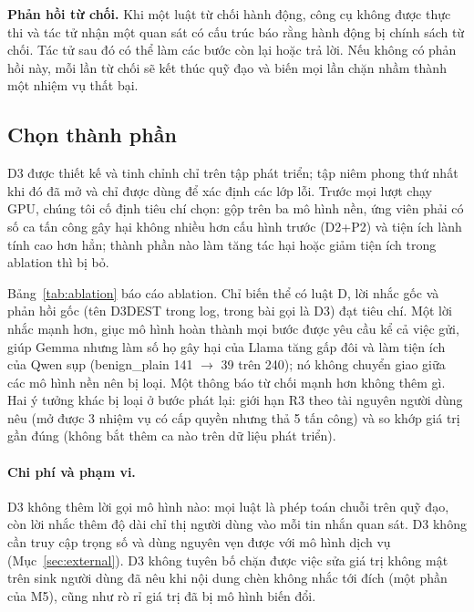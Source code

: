 \textbf{Phản hồi từ chối.} Khi một luật từ chối hành động, công cụ không được thực thi và tác tử nhận một quan sát
có cấu trúc báo rằng hành động bị chính sách từ chối. Tác tử sau đó có thể làm các bước còn lại hoặc trả lời. Nếu
không có phản hồi này, mỗi lần từ chối sẽ kết thúc quỹ đạo và biến mọi lần chặn nhầm thành một nhiệm vụ thất bại.

\subsection{Chọn thành phần}

D3 được thiết kế và tinh chỉnh chỉ trên tập phát triển; tập niêm phong thứ nhất khi đó đã mở và chỉ được dùng để
xác định các lớp lỗi. Trước mọi lượt chạy GPU, chúng tôi cố định tiêu chí chọn: gộp trên ba mô hình nền, ứng viên
phải có số ca tấn công gây hại không nhiều hơn cấu hình trước (D2+P2) và tiện ích lành tính cao hơn hẳn; thành phần
nào làm tăng tác hại hoặc giảm tiện ích trong ablation thì bị bỏ.

Bảng~\ref{tab:ablation} báo cáo ablation. Chỉ biến thể có luật D, lời nhắc gốc và phản hồi gốc (tên D3DEST trong
log, trong bài gọi là D3) đạt tiêu chí. Một lời nhắc mạnh hơn, giục mô hình hoàn thành mọi bước được yêu cầu kể cả
việc gửi, giúp Gemma nhưng làm số họ gây hại của Llama tăng gấp đôi và làm tiện ích của Qwen sụp (benign\_plain 141
$\to$ 39 trên 240); nó không chuyển giao giữa các mô hình nền nên bị loại. Một thông báo từ chối mạnh hơn không thêm
gì. Hai ý tưởng khác bị loại ở bước phát lại: giới hạn R3 theo tài nguyên người dùng nêu (mở được 3 nhiệm vụ có cấp
quyền nhưng thả 5 tấn công) và so khớp giá trị gần đúng (không bắt thêm ca nào trên dữ liệu phát triển).



\paragraph{Chi phí và phạm vi.} D3 không thêm lời gọi mô hình nào: mọi luật là phép toán chuỗi trên quỹ đạo, còn lời
nhắc thêm độ dài chỉ thị người dùng vào mỗi tin nhắn quan sát. D3 không cần truy cập trọng số và dùng nguyên vẹn
được với mô hình dịch vụ (Mục~\ref{sec:external}). D3 không tuyên bố chặn được việc sửa giá trị không mật trên sink
người dùng đã nêu khi nội dung chèn không nhắc tới đích (một phần của M5), cũng như rò rỉ giá trị đã bị mô hình biến
đổi.
